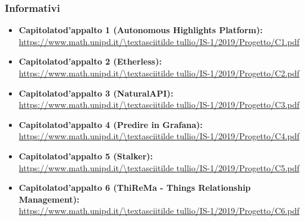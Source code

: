 \subsubsection{Informativi}
\begin{itemize}
    \item \textbf{Capitolato\glo d'appalto 1 (Autonomous Highlights Platform):}\\ 
    \url{https://www.math.unipd.it/\textasciitilde tullio/IS-1/2019/Progetto/C1.pdf}
    \item \textbf{Capitolato\glo d'appalto 2 (Etherless):}\\ 
	\url{https://www.math.unipd.it/\textasciitilde tullio/IS-1/2019/Progetto/C2.pdf}
    \item \textbf{Capitolato\glo d'appalto 3 (NaturalAPI):}\\ 
    \url{https://www.math.unipd.it/\textasciitilde tullio/IS-1/2019/Progetto/C3.pdf}
    \item \textbf{Capitolato\glo d'appalto 4 (Predire in Grafana):}\\ 
    \url{https://www.math.unipd.it/\textasciitilde tullio/IS-1/2019/Progetto/C4.pdf}
    \item \textbf{Capitolato\glo d'appalto 5 (Stalker):}\\ 
    \url{https://www.math.unipd.it/\textasciitilde tullio/IS-1/2019/Progetto/C5.pdf}
    \item \textbf{Capitolato\glo d'appalto 6 (ThiReMa - Things Relationship Management):}\\ 
    \url{https://www.math.unipd.it/\textasciitilde tullio/IS-1/2019/Progetto/C6.pdf}
\end{itemize}

	
	

